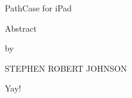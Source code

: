 \begin{center}
    PathCase for iPad

    Abstract

    by

    STEPHEN ROBERT JOHNSON

    Yay!
\end{center}
